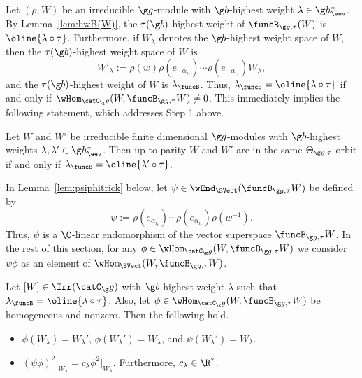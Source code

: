 \documentclass[12pt]{amsart}
\begin{document}
Let $(\rho,W)$ be an irreducible $\g g$-module with $\g b$-highest weight $\lambda\in\g h_\eev^*$.  By Lemma~\ref{lem:hwB(W)},  the $\tau(\g b)$-highest weight of $\funcB_{\g g,\tau}(W)$ is $\oline{\lambda\circ\tau}$.
Furthermore, 
if $W_\lambda$ denotes the $\g b$-highest weight space of $W$, 
then the $\tau(\g b)$-highest weight space of $W$ is 
\begin{equation}
\label{eq:WlamW'lam}
W'_\lambda:=
\rho(w)\rho(e_{-\alpha_{i_r}})\cdots \rho(e_{-\alpha_{i_1}})W_\lambda,
\end{equation}
and the  $\tau(\g b)$-highest weight of $W$ is $\lambda_\funcB$.
Thus, $\lambda_\funcB=\oline{\lambda\circ\tau}$ if and only if $\wHom_{\catC_\g g}(W,\funcB_{\g g,\tau}W)\neq 0$. This immediately implies the following statement, which addresses Step 1 above.
\begin{prp}
\label{prp:Step1}
Let $W$ and $W'$ be irreducible finite dimensional $\g g$-modules with $\g b$-highest weights $\lambda,\lambda'\in\g h_\eev^*$. Then up to parity $W$ and $W'$ are in the same $\Theta_{\g g,\tau}$-orbit if and only if $\lambda_\funcB=\oline{\lambda'\circ\tau}$.  
\end{prp}
In Lemma~\ref{lem:psiphitrick} below, let $\psi\in\wEnd_{\SVect}(\funcB_{\g g,\tau}W)$ be defined by
\[
\psi:=\rho(e_{\alpha_{i_1}})\cdots \rho(e_{\alpha_{i_r}})\rho(w^{-1})
.
\] 
Thus, $\psi$ is a $\C$-linear endomorphism of the vector superspace $\funcB_{\g g,\tau}W$. In the rest of this section, for 
any $\phi\in\wHom_{\catC_\g g}(W,\funcB_{\g g,\tau}W)$ we consider
$\psi\phi$ as an element of 
$\wHom_\SVect(W,\funcB_{\g g,\tau}W)$.
\begin{lem}
\label{lem:psiphitrick}
Let $[W]\in\Irr(\catC_\g g)$  with  $\g b$-highest weight $\lambda$ such that $\lambda_\funcB=\oline{\lambda\circ\tau}$. Also, let $\phi\in\wHom_{\catC_\g g}(W,\funcB_{\g g,\tau}W)$ be homogeneous and nonzero. 
Then the following  hold.
\begin{itemize}
\item[\rm (i)] $\phi(W_\lambda)=W_\lambda'$, $\phi(W_\lambda')=W_\lambda$, and $\psi(W_\lambda')=W_\lambda$. 
\item[\rm (ii)] $(\psi\phi)^2\big|_{W_\lambda}=c_\lambda\phi^2\big|_{W_\lambda}$. Furthermore, $c_\lambda\in\R^*$.
\end{itemize}
\end{lem}
\end{document}
